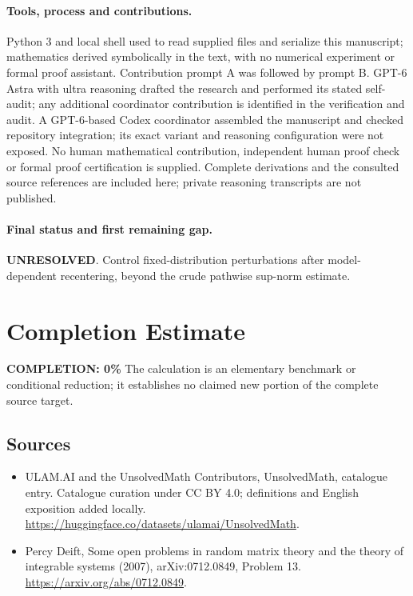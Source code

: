\documentclass[11pt]{article}
\begin{document}
\paragraph{Tools, process and contributions.}
Python 3 and local shell used to read supplied files and serialize this manuscript; mathematics derived symbolically in the text, with no numerical experiment or formal proof assistant. Contribution prompt A was followed by prompt B. GPT-6 Astra with ultra reasoning drafted the research and performed its stated self-audit; any additional coordinator contribution is identified in the verification and audit. A GPT-6-based Codex coordinator assembled the manuscript and checked repository integration; its exact variant and reasoning configuration were not exposed. No human mathematical contribution, independent human proof check or formal proof certification is supplied. Complete derivations and the consulted source references are included here; private reasoning transcripts are not published.

\paragraph{Final status and first remaining gap.}
\textbf{UNRESOLVED}. Control fixed-distribution perturbations after model-dependent recentering, beyond the crude pathwise sup-norm estimate.

\section{Completion Estimate}
\noindent\textbf{COMPLETION: 0\%}
The calculation is an elementary benchmark or conditional reduction; it establishes no claimed new portion of the complete source target.

\subsection{Sources}
\begin{itemize}
\item[\hypertarget{source:statement:1}{S1}] ULAM.AI and the UnsolvedMath Contributors, UnsolvedMath, catalogue entry. Catalogue curation under CC BY 4.0; definitions and English exposition added locally.
\url{https://huggingface.co/datasets/ulamai/UnsolvedMath}.
\item[\hypertarget{source:statement:2}{S2}] Percy Deift, Some open problems in random matrix theory and the theory of integrable systems (2007), arXiv:0712.0849, Problem 13.
\url{https://arxiv.org/abs/0712.0849}.
\end{itemize}
\label{end:statement}
\end{document}
